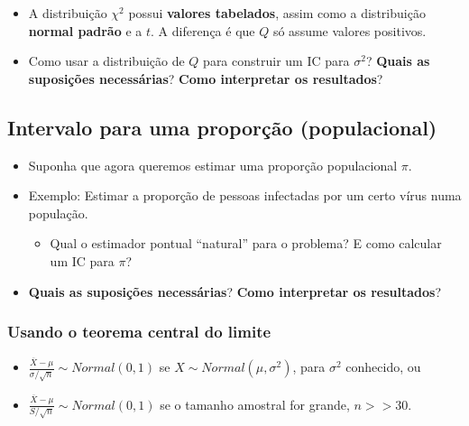 \documentclass[
]{article}
\providecommand{\tightlist}{%
  \setlength{\itemsep}{0pt}\setlength{\parskip}{0pt}}
\begin{document}
\begin{itemize}
\item
  A distribuição \(\chi^2\) possui \textbf{valores tabelados}, assim
  como a distribuição \textbf{normal padrão} e a \(t\). A diferença é
  que \(Q\) só assume valores positivos.
\item
  Como usar a distribuição de \(Q\) para construir um IC para
  \(\sigma^2\)? \textbf{Quais as suposições necessárias}? \textbf{Como
  interpretar os resultados}?
\end{itemize}

\vspace{0.5cm}

\clearpage

\hypertarget{intervalo-para-uma-proporuxe7uxe3o-populacional}{%
\subsection{Intervalo para uma proporção
(populacional)}\label{intervalo-para-uma-proporuxe7uxe3o-populacional}}

\begin{itemize}
\item
  Suponha que agora queremos estimar uma proporção populacional \(\pi\).
\item
  Exemplo: Estimar a proporção de pessoas infectadas por um certo vírus
  numa população.

  \begin{itemize}
  \tightlist
  \item
    Qual o estimador pontual ``natural'' para o problema? E como
    calcular um IC para \(\pi\)?\\
  \end{itemize}
\item
  \textbf{Quais as suposições necessárias}? \textbf{Como interpretar os
  resultados}?
\end{itemize}

\vspace{0.5cm}

\hypertarget{usando-o-teorema-central-do-limite}{%
\subsubsection{Usando o teorema central do
limite}\label{usando-o-teorema-central-do-limite}}

\begin{itemize}
\tightlist
\item
  \(\frac{\overline X - \mu}{\sigma / \sqrt{n}} \sim Normal(0,1)\) se
  \(X \sim Normal(\mu, \sigma^2)\), para \(\sigma^2\) conhecido, ou
\item
  \(\frac{\overline X - \mu}{S / \sqrt{n}} \sim Normal(0,1)\) se o
  tamanho amostral for grande, \(n >> 30\).
\end{itemize}
\end{document}

